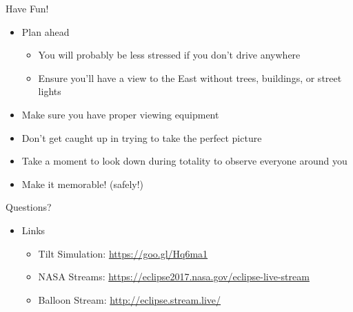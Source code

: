 \documentclass[pdf, aspectratio=169]{beamer}
\begin{document}
\begin{frame}{Have Fun!}
	\begin{itemize}
		\item Plan ahead
			\begin{itemize}
				\item You will probably be less stressed if you don't drive anywhere
				\item Ensure you'll have a view to the East without trees, buildings, or street lights
			\end{itemize}
		\item Make sure you have proper viewing equipment
		\item Don't get caught up in trying to take the perfect picture
		\item Take a moment to look down during totality to observe everyone around you
		\item Make it memorable! (safely!)
	\end{itemize}
\end{frame}

\begin{frame}{Questions?}
	\begin{itemize}
		\item Links
			\begin{itemize}
				\item Tilt Simulation: \url{https://goo.gl/Hq6ma1}
				\item NASA Streams: \url{https://eclipse2017.nasa.gov/eclipse-live-stream}
				\item Balloon Stream: \url{http://eclipse.stream.live/}
			\end{itemize}
			
	\end{itemize}
	
\end{frame}
\end{document}
